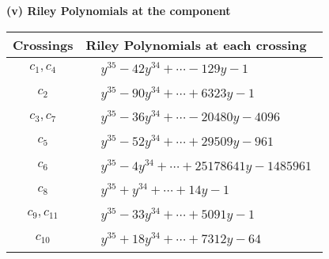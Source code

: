 \documentclass[1p]{elsarticle_modified}
\theoremstyle{definition}
\begin{document}
\newpage\renewcommand{\arraystretch}{1}
\flushleft \textbf{(v) Riley Polynomials at the component}\newline \\
\begin{tabular}{m{50pt}|m{274pt}}
Crossings & \hspace{64pt}Riley Polynomials at each crossing \\
\hline $$\begin{aligned}c_{1},c_{4}\end{aligned}$$&$\begin{aligned}
&y^{35}-42 y^{34}+\cdots-129 y-1
\end{aligned}$\\
\hline $$\begin{aligned}c_{2}\end{aligned}$$&$\begin{aligned}
&y^{35}-90 y^{34}+\cdots+6323 y-1
\end{aligned}$\\
\hline $$\begin{aligned}c_{3},c_{7}\end{aligned}$$&$\begin{aligned}
&y^{35}-36 y^{34}+\cdots-20480 y-4096
\end{aligned}$\\
\hline $$\begin{aligned}c_{5}\end{aligned}$$&$\begin{aligned}
&y^{35}-52 y^{34}+\cdots+29509 y-961
\end{aligned}$\\
\hline $$\begin{aligned}c_{6}\end{aligned}$$&$\begin{aligned}
&y^{35}-4 y^{34}+\cdots+25178641 y-1485961
\end{aligned}$\\
\hline $$\begin{aligned}c_{8}\end{aligned}$$&$\begin{aligned}
&y^{35}+y^{34}+\cdots+14 y-1
\end{aligned}$\\
\hline $$\begin{aligned}c_{9},c_{11}\end{aligned}$$&$\begin{aligned}
&y^{35}-33 y^{34}+\cdots+5091 y-1
\end{aligned}$\\
\hline $$\begin{aligned}c_{10}\end{aligned}$$&$\begin{aligned}
&y^{35}+18 y^{34}+\cdots+7312 y-64
\end{aligned}$\\
\hline
\end{tabular}\\~\\
\end{document}
